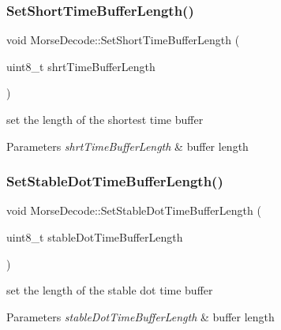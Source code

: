 \subsubsection{\texorpdfstring{Set\+Short\+Time\+Buffer\+Length()}{SetShortTimeBufferLength()}}
{\footnotesize\ttfamily void Morse\+Decode\+::\+Set\+Short\+Time\+Buffer\+Length (\begin{DoxyParamCaption}\item[{uint8\+\_\+t}]{shrt\+Time\+Buffer\+Length }\end{DoxyParamCaption})}



set the length of the shortest time buffer 


\begin{DoxyParams}{Parameters}
{\em shrt\+Time\+Buffer\+Length} & buffer length \\
\hline
\end{DoxyParams}
\mbox{\label{classMorseDecode_aaaf7bfea0a9bcf523685da983b2bec20}} 
\subsubsection{\texorpdfstring{Set\+Stable\+Dot\+Time\+Buffer\+Length()}{SetStableDotTimeBufferLength()}}
{\footnotesize\ttfamily void Morse\+Decode\+::\+Set\+Stable\+Dot\+Time\+Buffer\+Length (\begin{DoxyParamCaption}\item[{uint8\+\_\+t}]{stable\+Dot\+Time\+Buffer\+Length }\end{DoxyParamCaption})}



set the length of the stable dot time buffer 


\begin{DoxyParams}{Parameters}
{\em stable\+Dot\+Time\+Buffer\+Length} & buffer length \\
\hline
\end{DoxyParams}
\mbox{\label{classMorseDecode_a95efbd76c6d03f97868e2e54b5c305cb}} 
